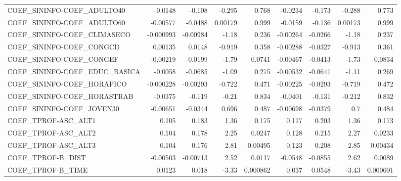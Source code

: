 \begin{tabular}{lrrrrrrrr}
COEF\_SININFO-COEF\_ADULTO40        &     -0.0148 &       -0.108 &  -0.295 &    0.768 &    -0.0234 &      -0.173 &       -0.288 &         0.773 \\
COEF\_SININFO-COEF\_ADULTO60        &    -0.00577 &      -0.0488 & 0.00179 &    0.999 &    -0.0159 &      -0.136 &      0.00173 &         0.999 \\
COEF\_SININFO-COEF\_CLIMASECO       &   -0.000993 &     -0.00984 &   -1.18 &    0.236 &   -0.00264 &     -0.0266 &        -1.18 &         0.237 \\
COEF\_SININFO-COEF\_CONGCD          &     0.00135 &       0.0148 &  -0.919 &    0.358 &   -0.00288 &     -0.0327 &       -0.913 &         0.361 \\
COEF\_SININFO-COEF\_CONGEF          &    -0.00219 &      -0.0199 &   -1.79 &   0.0741 &   -0.00467 &     -0.0413 &        -1.73 &        0.0834 \\
COEF\_SININFO-COEF\_EDUC\_BASICA     &     -0.0058 &      -0.0685 &   -1.09 &    0.275 &   -0.00532 &     -0.0641 &        -1.11 &         0.269 \\
COEF\_SININFO-COEF\_HORAPICO        &   -0.000228 &     -0.00293 &  -0.722 &    0.471 &   -0.00225 &     -0.0293 &       -0.719 &         0.472 \\
COEF\_SININFO-COEF\_HORASTRAB       &     -0.0375 &       -0.119 &   -0.21 &    0.834 &    -0.0401 &      -0.131 &       -0.212 &         0.832 \\
COEF\_SININFO-COEF\_JOVEN30         &    -0.00651 &      -0.0344 &   0.696 &    0.487 &   -0.00698 &     -0.0379 &          0.7 &         0.484 \\
COEF\_TPROF-ASC\_ALT1               &       0.105 &        0.183 &    1.36 &    0.175 &      0.117 &       0.203 &         1.36 &         0.173 \\
COEF\_TPROF-ASC\_ALT2               &       0.104 &        0.178 &    2.25 &   0.0247 &      0.128 &       0.215 &         2.27 &        0.0233 \\
COEF\_TPROF-ASC\_ALT3               &       0.104 &        0.176 &    2.81 &  0.00495 &      0.123 &       0.208 &         2.85 &       0.00434 \\
COEF\_TPROF-B\_DIST                 &    -0.00503 &     -0.00713 &    2.52 &   0.0117 &    -0.0548 &     -0.0855 &         2.62 &        0.0089 \\
COEF\_TPROF-B\_TIME                 &      0.0123 &        0.018 &   -3.33 & 0.000862 &      0.037 &      0.0548 &        -3.43 &      0.000601 \\

\end{tabular}
